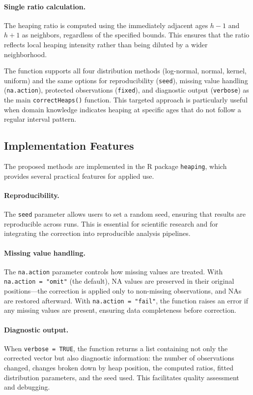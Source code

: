 \documentclass[pdflatex,sn-mathphys-num]{sn-jnl}%
\theoremstyle{thmstyleone}%
\theoremstyle{thmstyletwo}%
\theoremstyle{thmstylethree}%
\begin{document}
\paragraph{Single ratio calculation.} The heaping ratio is computed using the immediately adjacent ages $h-1$ and $h+1$ as neighbors, regardless of the specified bounds. This ensures that the ratio reflects local heaping intensity rather than being diluted by a wider neighborhood.

The function supports all four distribution methods (log-normal, normal, kernel, uniform) and the same options for reproducibility (\texttt{seed}), missing value handling (\texttt{na.action}), protected observations (\texttt{fixed}), and diagnostic output (\texttt{verbose}) as the main \texttt{correctHeaps()} function. This targeted approach is particularly useful when domain knowledge indicates heaping at specific ages that do not follow a regular interval pattern.

\subsection{Implementation Features}

The proposed methods are implemented in the R package \texttt{heaping}, which provides several practical features for applied use.

\paragraph{Reproducibility.} The \texttt{seed} parameter allows users to set a random seed, ensuring that results are reproducible across runs. This is essential for scientific research and for integrating the correction into reproducible analysis pipelines.

\paragraph{Missing value handling.} The \texttt{na.action} parameter controls how missing values are treated. With \texttt{na.action = "omit"} (the default), NA values are preserved in their original positions---the correction is applied only to non-missing observations, and NAs are restored afterward. With \texttt{na.action = "fail"}, the function raises an error if any missing values are present, ensuring data completeness before correction.

\paragraph{Diagnostic output.} When \texttt{verbose = TRUE}, the function returns a list containing not only the corrected vector but also diagnostic information: the number of observations changed, changes broken down by heap position, the computed ratios, fitted distribution parameters, and the seed used. This facilitates quality assessment and debugging.
\end{document}
